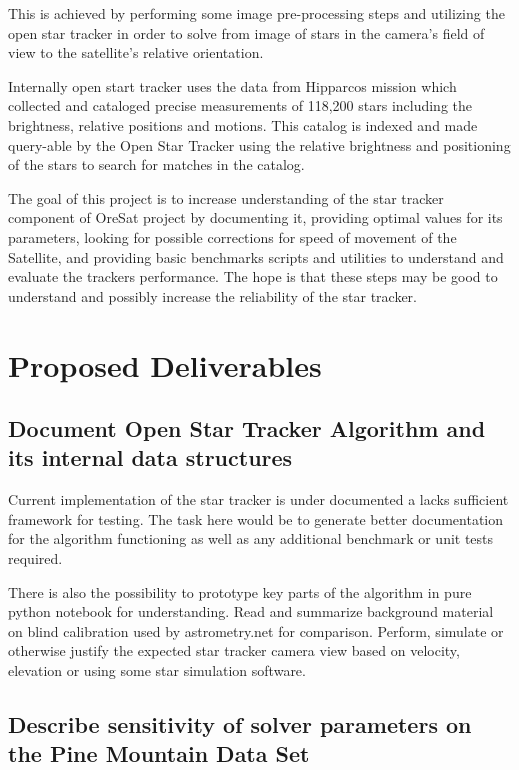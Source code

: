 \documentclass[]{article}
\begin{document}
	This is achieved by performing some image pre-processing steps and utilizing the open star tracker \cite{OpenStarTracker} in order to solve from image of stars in the camera's field of view to the satellite's relative orientation.
	
	Internally open start tracker uses the data from Hipparcos\cite{Hipparchos} mission which collected and cataloged precise measurements of 118,200 stars including the brightness, relative positions and motions.  This catalog is indexed and made query-able by the Open Star Tracker using the relative brightness and positioning of the stars to search for matches in the catalog.
	
	The goal of this project is to increase understanding of the star tracker component of OreSat project by documenting it, providing optimal values for its parameters, looking for possible corrections for speed of movement of the Satellite, and providing  basic benchmarks scripts and utilities to understand  and evaluate the trackers performance. The hope is that these steps may be good to understand and possibly increase the reliability of the star tracker.
	
	\section{Proposed Deliverables}
	
	\subsection{Document Open Star Tracker Algorithm and its internal data structures}
	
	Current implementation of the star tracker is under documented
	a lacks sufficient framework for testing. The task here would be to generate better documentation for the algorithm functioning as well as any additional benchmark or unit tests required.
	
	There is also the possibility to prototype key parts of the algorithm in pure python notebook for understanding. Read and summarize background material on blind calibration used by astrometry.net \cite{Astrometry.net} for comparison.   
	Perform, simulate or otherwise justify the expected star tracker camera view based on velocity, elevation or using some star simulation software. 
	
	\subsection{Describe sensitivity of solver parameters on the Pine Mountain Data Set}
	
\end{document}
